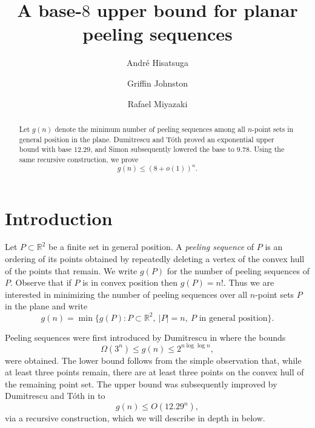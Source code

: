 \documentclass[11pt]{amsart}
\title{A base-$8$ upper bound for planar peeling sequences}
\author{Andr\'e Hisatsuga}
\author{Griffin Johnston}
\author{Rafael Miyazaki}
\date{}
\theoremstyle{definition}
\newcommand{\R}{\mathbb{R}}
\begin{document}
\begin{abstract}
Let $g(n)$ denote the minimum number of peeling sequences among all $n$-point sets in general position in the plane. Dumitrescu and T\'oth proved an exponential upper bound with base $12.29$, and Simon subsequently lowered the base to $9.78$. Using the same recursive construction, we prove
\begin{equation*}
   g(n) \le (8+o(1))^n.
\end{equation*}

\end{abstract}

\maketitle


\section{Introduction}\label{sec:introduction}
Let $P\subset\R^2$ be a finite set in general position. A \emph{peeling sequence} of $P$ is an ordering of its points obtained by repeatedly deleting a vertex of the convex hull of the points that remain. We write $g(P)$ for the number of peeling sequences of $P$.
Observe that if $P$ is in convex position 
then $g(P) = n!$. Thus we are interested in 
minimizing the number of peeling sequences 
over all $n$-point sets $P$ in the plane and write 
\begin{equation*}
   g(n)=\min\{g(P): P\subset\R^2,\ |P|=n,\ P\text{ in general position}\}.
\end{equation*}
\par 
Peeling sequences were first introduced by 
Dumitrescu in \cite{dumitrescuOriginal2022peeling} where the 
bounds 
\begin{equation*}
    \Omega(3^n) \leq g(n) \leq 2^{n\log\log n}, 
\end{equation*}
were obtained. The lower bound follows 
from the simple observation that, while at least three points remain, there are at least 
three points on the convex hull of 
the remaining point set. 
The upper bound was subsequently improved 
by Dumitrescu and T\'oth in 
\cite{dumitrescuToth2025peeling} to 
\begin{equation*}
    g(n) \leq O(12.29^n), 
\end{equation*}
via a recursive construction, which we will 
describe in depth in  below. 
\end{document}
